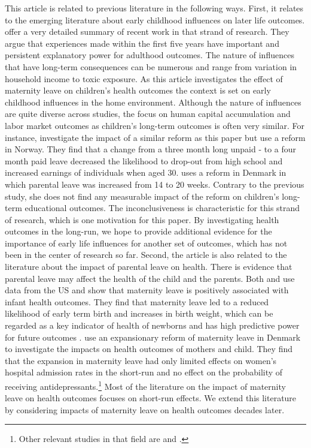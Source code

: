 \documentclass[a4paper ]{article}
\begin{document}
This article is related to previous literature in the following ways. First, it relates to the emerging literature about early childhood influences on later life outcomes. \cite{currie2011human} offer a very detailed summary of recent work in that strand of research. They argue that experiences made within the first five years have important and persistent explanatory power for adulthood outcomes. The nature of influences that have long-term consequences can be numerous and range from variation in household income to toxic exposure. As this article investigates the effect of maternity leave on children's health outcomes the context is set on early childhood influences in the home environment. Although the nature of influences are quite diverse across studies, the focus on human capital accumulation and labor market outcomes as children's long-term outcomes is often very similar. For instance, \cite{carneiro2015flying} investigate the impact of a similar reform as this paper but use a reform in Norway. They find that a change from a three month long unpaid - to a four month paid leave decreased the likelihood to drop-out from high school and increased earnings of individuals when aged 30. \cite{rasmussen2010increasing} uses a reform in Denmark in which parental leave was increased from 14 to 20 weeks. Contrary to the previous study, she does not find any measurable impact of the reform on children's long-term educational outcomes. The inconclusiveness is characteristic for this strand of research, which is one motivation for this paper. By investigating health outcomes in the long-run, we hope to provide additional evidence for the importance of early life influences for another set of outcomes, which has not been in the center of research so far. \newline
Second, the article is also related to the literature about the impact of parental leave on health. There is evidence that parental leave may affect the health of the child and the parents. Both \cite{stearns2015effects} and \cite{rossin2011effects} use data from the US and show that maternity leave is positively associated with infant health outcomes. They find that maternity leave led to a reduced likelihood of early term birth and increases in birth weight, which can be regarded as a key indicator of health of newborns and has high predictive power for future outcomes \citep{almond2005costs,currie2007biology}. \cite{beuchert2014length} use an expansionary reform of maternity leave in Denmark to investigate the impacts on health outcomes of mothers and child. They find that the expansion in maternity leave had only limited effects on women's hospital admission rates in the short-run and no effect on the probability of receiving antidepressants.\footnote{Other relevant studies in that field are \cite{avendano2015long} and \cite{chatterji2005does}.} Most of the literature on the impact of maternity leave on health outcomes focuses on short-run effects. We extend this literature by considering impacts of maternity leave on health outcomes decades later.\newline 
\end{document}
